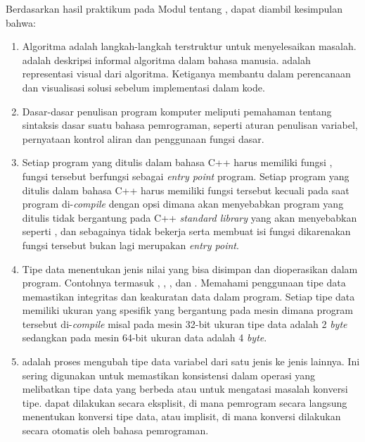 \documentclass[../main.tex]{subfiles}
\begin{document}
    \noindent \hspace*{0.75cm}Berdasarkan hasil praktikum pada Modul {\thechapter} tentang \leftmark, dapat diambil kesimpulan bahwa:
    \begin{enumerate}
        \item {
            Algoritma adalah langkah-langkah terstruktur untuk menyelesaikan masalah. {\Pseudocode} adalah deskripsi informal algoritma dalam bahasa manusia. {\Flowchart} adalah representasi visual dari algoritma. Ketiganya membantu dalam perencanaan dan visualisasi solusi sebelum implementasi dalam kode.
        }
        \item {
            Dasar-dasar penulisan program komputer meliputi pemahaman tentang sintaksis dasar suatu bahasa pemrograman, seperti aturan penulisan variabel, pernyataan kontrol aliran dan penggunaan fungsi dasar.
        }
        \item {
            Setiap program yang ditulis dalam bahasa C++ harus memiliki fungsi , fungsi tersebut berfungsi sebagai \textit{entry point} program. Setiap program yang ditulis dalam bahasa C++ harus memiliki fungsi tersebut kecuali pada saat program di-\textit{compile} dengan opsi  dimana akan menyebabkan program yang ditulis tidak bergantung pada C++ \textit{standard library} yang akan menyebabkan {\header} {\file} seperti ,  dan sebagainya tidak bekerja serta membuat isi fungsi  dikarenakan fungsi tersebut bukan lagi merupakan \textit{entry point}.
        }
        \item {
            Tipe data menentukan jenis nilai yang bisa disimpan dan dioperasikan dalam program. Contohnya termasuk , , ,  dan . Memahami penggunaan tipe data memastikan integritas dan keakuratan data dalam program. Setiap tipe data memiliki ukuran yang spesifik yang bergantung pada mesin dimana program tersebut di-\textit{compile} misal pada mesin 32-bit ukuran tipe data  adalah 2 \textit{byte} sedangkan pada mesin 64-bit ukuran data  adalah 4 \textit{byte}.
        }
        \item {
            {\Typecasting} adalah proses mengubah tipe data variabel dari satu jenis ke jenis lainnya. Ini sering digunakan untuk memastikan konsistensi dalam operasi yang melibatkan tipe data yang berbeda atau untuk mengatasi masalah konversi tipe. {\Typecasting} dapat dilakukan secara eksplisit, di mana pemrogram secara langsung menentukan konversi tipe data, atau implisit, di mana konversi dilakukan secara otomatis oleh bahasa pemrograman.
        }
    \end{enumerate}
\end{document}
